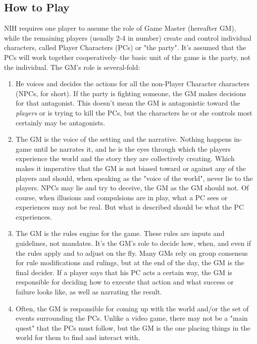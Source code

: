 \subsection{How to Play}
NIH requires one player to assume the role of Game Master (hereafter GM), while the remaining players (usually 2-4 in number) create and control individual characters, called Player Characters (PCs) or "the party". It's assumed that the PCs will work together cooperatively--the basic unit of the game is the party, not the individual. The GM's role is several-fold:
\begin{enumerate}
    \item He voices and decides the actions for all the non-Player Character characters (NPCs, for short). If the party is fighting someone, the GM makes decisions for that antagonist. This doesn't mean the GM is antagonistic toward the \textit{players} or is trying to kill the PCs, but the characters he or she controls most certainly may be antagonists.
    \item The GM is the voice of the setting and the narrative. Nothing happens in-game until he narrates it, and he is the eyes through which the players experience the world and the story they are collectively creating. Which makes it imperative that the GM is not biased toward or against any of the players and should, when speaking as the "voice of the world", never lie to the players. NPCs may lie and try to deceive, the GM as the GM should not. Of course, when illusions and compulsions are in play, what a PC sees or experiences may not be real. But what is described should be what the PC experiences.
    \item The GM is the rules engine for the game. These rules are inputs and guidelines, not mandates. It's the GM's role to decide how, when, and even if the rules apply and to adjust on the fly. Many GMs rely on group consensus for rule modifications and rulings, but at the end of the day, the GM is the final decider. If a player says that his PC acts a certain way, the GM is responsible for deciding how to execute that action and what success or failure looks like, as well as narrating the result. 
    \item Often, the GM is responsible for coming up with the world and/or the set of events surrounding the PCs. Unlike a video game, there may not be a "main quest" that the PCs must follow, but the GM is the one placing things in the world for them to find and interact with.
\end{enumerate}

